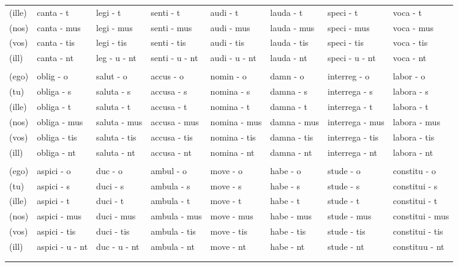\documentclass[a4paper, landscape]{article}
\begin{document}
\begin{landscape}
\begin{table}[]
\begin{tabular}{llllllll}
	(ille)	& canta - t		& legi - t		& senti - t		& audi - t		& lauda - t		& speci - t		 & voca - t \\
	(nos)	& canta - mus	& legi - mus	& senti - mus	& audi - mus	& lauda - mus	& speci - mus	 & voca - mus \\
	(vos)	& canta - tis	& legi - tis	& senti - tis	& audi - tis	& lauda - tis	& speci - tis	 & voca - tis \\
	(ill)	& canta - nt	& leg - u - nt	& senti - u - nt& audi - u - nt & lauda - nt	& speci - u - nt & voca - nt \\
	& & & &  &  &  & \\
	(ego)	& oblig  - o	& salut	 - o	& accus  - o	& nomin  - o	& damn  - o		& interreg  - o		& labor - o \\
    (tu)	& obliga - s	& saluta - s	& accusa - s	& nomina - s	& damna - s		& interrega - s		& labora - s \\
	(ille)	& obliga - t	& saluta - t	& accusa - t	& nomina - t	& damna - t		& interrega - t		& labora - t \\
	(nos)	& obliga - mus	& saluta - mus	& accusa - mus	& nomina - mus	& damna - mus	& interrega - mus	& labora - mus \\
    (vos)	& obliga - tis	& saluta - tis	& accusa - tis	& nomina - tis	& damna - tis	& interrega - tis	& labora - tis \\
    (ill)	& obliga - nt	& saluta - nt	& accusa - nt	& nomina - nt	& damna - nt	& interrega - nt	& labora - nt \\
	& & & &  &  &  & \\
	(ego)   & aspici - o		& duc  - o		& ambul  - o	& move - o		& habe - o	 & stude - o    & constitu  - o \\
	(tu)	& aspici - s		& duci - s		& ambula - s	& move - s		& habe - s   & stude - s	& constitui - s\\
	(ille)	& aspici - t		& duci - t		& ambula - t	& move - t		& habe - t   & stude - t	& constitui - t \\
	(nos)	& aspici - mus		& duci - mus	& ambula - mus	& move - mus	& habe - mus & stude - mus  & constitui - mus \\
	(vos)	& aspici - tis		& duci - tis	& ambula - tis	& move - tis	& habe - tis & stude - tis  & constitui - tis \\
	(ill)	& aspici - u -  nt 	& duc - u - nt	& ambula - nt	& move - nt		& habe - nt  & stude - nt   & constituu - nt \\
	& & & & &  &  & \\
	& & & &  &  & \\

\end{tabular}
\end{table}
\end{landscape}
\end{document}

